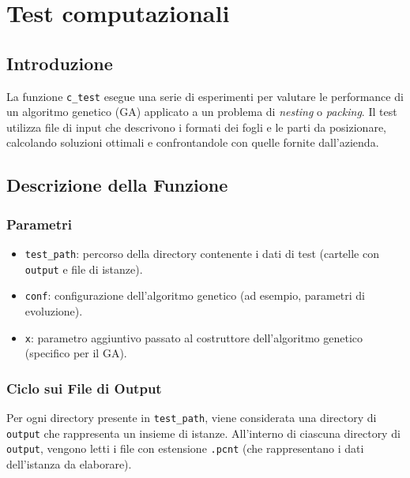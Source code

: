 \chapter{Test computazionali}
\label{cap:verifica-validazione}

\section{Introduzione}
La funzione \texttt{c\_test} esegue una serie di esperimenti per valutare le performance di un algoritmo genetico (GA) applicato a un problema di \emph{nesting} o \emph{packing}. Il test utilizza file di input che descrivono i formati dei fogli e le parti da posizionare, calcolando soluzioni ottimali e confrontandole con quelle fornite dall'azienda.

\section{Descrizione della Funzione}

\subsection{Parametri}
\begin{itemize}
    \item \texttt{test\_path}: percorso della directory contenente i dati di test (cartelle con \texttt{output} e file di istanze).
    \item \texttt{conf}: configurazione dell'algoritmo genetico (ad esempio, parametri di evoluzione).
    \item \texttt{x}: parametro aggiuntivo passato al costruttore dell'algoritmo genetico (specifico per il GA).
\end{itemize}

\subsection{Ciclo sui File di Output}
Per ogni directory presente in \texttt{test\_path}, viene considerata una directory di \texttt{output} che rappresenta un insieme di istanze. All'interno di ciascuna directory di \texttt{output}, vengono letti i file con estensione \texttt{.pcnt} (che rappresentano i dati dell'istanza da elaborare).

